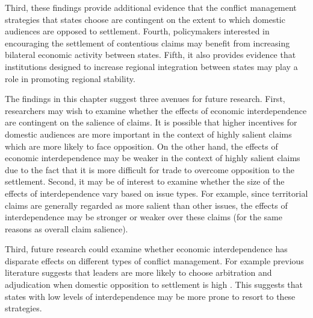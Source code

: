 Third, these findings provide additional evidence that the conflict management strategies that states choose are contingent on the extent to which domestic audiences are opposed to settlement. Fourth, policymakers interested in encouraging the settlement of contentious claims may benefit from increasing bilateral economic activity between states. Fifth, it also provides evidence that institutions designed to increase regional integration between states may play a role in promoting regional stability.

The findings in this chapter suggest three avenues for future research. First, researchers may wish to examine whether the effects of economic interdependence are contingent on the salience of claims. It is possible that higher incentives for domestic audiences are more important in the context of highly salient claims which are more likely to face opposition. On the other hand, the effects of economic interdependence may be weaker in the context of highly salient claims due to the fact that it is more difficult for trade to overcome opposition to the settlement. Second, it may be of interest to examine whether the size of the effects of interdependence vary based on issue types. For example, since territorial claims are generally regarded as more salient than other issues, the effects of interdependence may be stronger or weaker over these claims (for the same reasons as overall claim salience). 

Third, future research could examine whether economic interdependence has disparate effects on different types of conflict management. For example previous literature suggests that leaders are more likely to choose arbitration and adjudication when domestic opposition to settlement is high \citep[e.g., ][]{allee2006}. This suggests that states with low levels of interdependence may be more prone to resort to these strategies.



%